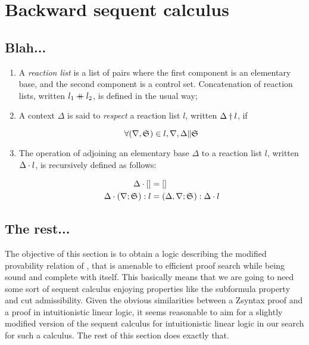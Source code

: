 \section{Backward sequent calculus}

\subsection{Blah...}

\begin{definition}
  \begin{enumerate}
  \item A \emph{reaction list} is a list of pairs where the first component is
    an elementary base, and the second component is a control set. Concatenation
    of reaction lists, written $l_1 \mathbin{+\mkern-10mu+} l_2$, is defined in the usual
    way;
  \item A context $\Delta$ is said to \emph{respect} a reaction list $l$,
    written $\Delta \dagger l$, if

    \[
      \forall (\nabla, \mathfrak{S}_{})\in l, \nabla, \Delta \| \mathfrak{S}_{}
    \]

  \item The operation of adjoining an elementary base $\Delta$ to a reaction
    list $l$, written $\Delta \cdot l$, is recursively defined as
    follows:

    \begin{align*}
      \Delta \cdot [] &= [] \\
      \Delta \cdot (\nabla;\mathfrak{S}_{}):l &= (\Delta,\nabla;\mathfrak{S}_{}):\Delta \cdot l
    \end{align*}
  \end{enumerate}

\end{definition}

\subsection{The rest...}

The objective of this section is to obtain a logic describing the modified
provability relation of \eznd{}, that is amenable to efficient proof search
while being sound and complete with \eznd{} itself. This basically means that we
are going to need some sort of sequent calculus enjoying properties like the
subformula property and cut admissibility.  Given the obvious similarities
between a Zsyntax proof and a proof in intuitionistic linear logic, it seems
reasonable to aim for a slightly modified version of the sequent calculus for
intuitionistic linear logic in our search for such a calculus. The rest of this
section does exactly that.

